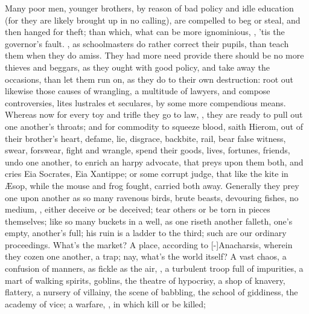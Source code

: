 {Many poor men, younger brothers, \etc{} by reason of bad policy and
idle education (for they are likely brought up in no calling), are
compelled to beg or steal, and then hanged for theft; than which, what
can be more ignominious, , 'tis the governor's fault. , as schoolmasters do rather correct their pupils,
than teach them when they do amiss. They had more need provide
there should be no more thieves and beggars, as they ought with good
policy, and take away the occasions, than let them run on, as they do
to their own destruction: root out likewise those causes of wrangling,
a multitude of lawyers, and compose controversies, lites lustrales et
seculares, by some more compendious means. Whereas now for every toy
and trifle they go to law, , they are ready to pull out one another's
throats; and for commodity to squeeze blood, saith Hierom, out of
their brother's heart, defame, lie, disgrace, backbite, rail, bear
false witness, swear, forswear, fight and wrangle, spend their goods,
lives, fortunes, friends, undo one another, to enrich an harpy
advocate, that preys upon them both, and cries Eia Socrates, Eia
Xantippe; or some corrupt judge, that like the kite in \AE{}sop,
while the mouse and frog fought, carried both away. Generally they prey
one upon another as so many ravenous birds, brute beasts, devouring
fishes, no medium, , either deceive or be
deceived; tear others or be torn in pieces themselves; like so many
buckets in a well, as one riseth another falleth, one's empty,
another's full; his ruin is a ladder to the third; such are our
ordinary proceedings. What's the market? A place, according to
[-\baselineskip]Anacharsis, wherein they cozen one another, a trap; nay, what's
the world itself? A vast chaos, a confusion of manners, as fickle
as the air, , a turbulent troop full of impurities,
a mart of walking spirits, goblins, the theatre of hypocrisy, a shop of
knavery, flattery, a nursery of villainy, the scene of babbling, the
school of giddiness, the academy of vice; a warfare, , in which kill or be killed;
}
